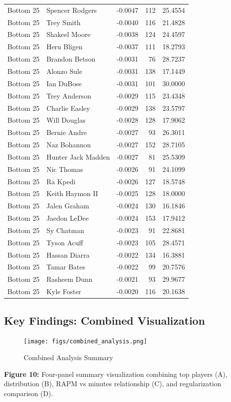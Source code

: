 \documentclass[
  letterpaper,
  DIV=11,
  numbers=noendperiod]{scrartcl}
\begin{document}
\begin{longtable}[t]{llrrr}
Bottom 25 & Spencer Rodgers & -0.0047 & 112 & 25.4554\\
Bottom 25 & Trey Smith & -0.0040 & 116 & 21.4828\\
Bottom 25 & Shakeel Moore & -0.0038 & 124 & 24.4597\\
Bottom 25 & Heru Bligen & -0.0037 & 111 & 18.2793\\
\addlinespace
Bottom 25 & Brandon Betson & -0.0031 & 76 & 28.7237\\
Bottom 25 & Alonzo Sule & -0.0031 & 138 & 17.1449\\
Bottom 25 & Ian DuBose & -0.0031 & 101 & 30.0000\\
Bottom 25 & Trey Anderson & -0.0029 & 115 & 23.4348\\
Bottom 25 & Charlie Easley & -0.0029 & 138 & 23.5797\\
\addlinespace
Bottom 25 & Will Douglas & -0.0028 & 128 & 17.9062\\
Bottom 25 & Bernie Andre & -0.0027 & 93 & 26.3011\\
Bottom 25 & Naz Bohannon & -0.0027 & 152 & 28.7105\\
Bottom 25 & Hunter Jack Madden & -0.0027 & 81 & 25.5309\\
Bottom 25 & Nic Thomas & -0.0026 & 91 & 24.1099\\
\addlinespace
Bottom 25 & Ra Kpedi & -0.0026 & 127 & 18.5748\\
Bottom 25 & Keith Haymon II & -0.0025 & 128 & 18.0000\\
Bottom 25 & Jalen Graham & -0.0024 & 130 & 16.1846\\
Bottom 25 & Jaedon LeDee & -0.0024 & 153 & 17.9412\\
Bottom 25 & Sy Chatman & -0.0023 & 91 & 22.8681\\
\addlinespace
Bottom 25 & Tyson Acuff & -0.0023 & 105 & 28.4571\\
Bottom 25 & Hassan Diarra & -0.0022 & 134 & 16.3881\\
Bottom 25 & Tamar Bates & -0.0022 & 99 & 20.7576\\
Bottom 25 & Rasheem Dunn & -0.0021 & 93 & 29.9677\\
Bottom 25 & Kyle Foster & -0.0020 & 116 & 20.1638\\
\bottomrule
\end{longtable}

\subsection{Key Findings: Combined
Visualization}\label{key-findings-combined-visualization}

\begin{figure}[H]

{\centering \texttt{[image: figs/combined\_analysis.png]}

}

\caption{Combined Analysis Summary}

\end{figure}%

\textbf{Figure 10:} Four-panel summary visualization combining top
players (A), distribution (B), RAPM vs minutes relationship (C), and
regularization comparison (D).
\end{document}

